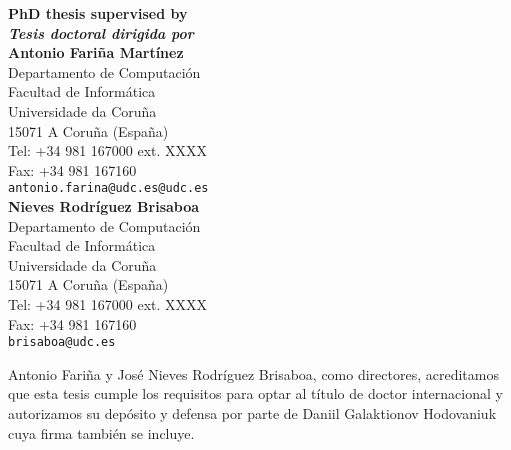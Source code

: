 \thispagestyle{empty}

\begin{flushleft}

{\bfseries PhD thesis supervised by} \\[1pt]
{\itshape \bfseries Tesis doctoral dirigida por} \\[4mm]

{\bfseries Antonio Fari\~na Mart\'inez} \\[2pt]
Departamento de Computaci\'on \\[1pt]
Facultad de Inform\'atica \\[1pt]
Universidade da Coru\~na \\[1pt]
15071 A Coru\~na (Espa\~na) \\[1pt]
Tel: +34 981 167000 ext. XXXX \\[1pt]
Fax: +34 981 167160 \\[1pt]
\verb=antonio.farina@udc.es@udc.es = \\[4mm]

{\bfseries Nieves Rodr\'iguez Brisaboa} \\[2pt]
Departamento de Computaci\'on \\[1pt]
Facultad de Inform\'atica \\[1pt]
Universidade da Coru\~na \\[1pt]
15071 A Coru\~na (Espa\~na) \\[1pt]
Tel: +34 981 167000 ext. XXXX \\[1pt]
Fax: +34 981 167160 \\[1pt]
\verb=brisaboa@udc.es=

\end{flushleft}

Antonio Fari\~na y Jos\'e Nieves Rodr\'iguez Brisaboa, como directores, acreditamos que esta tesis cumple los requisitos para optar al t\'itulo de doctor internacional y autorizamos su dep\'osito y defensa por parte de Daniil Galaktionov Hodovaniuk cuya firma tambi\'en se incluye.



